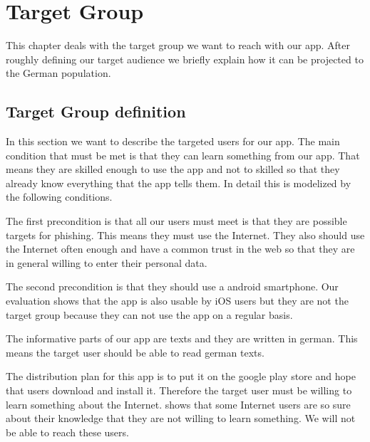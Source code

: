 \section{Target Group}
\label{s:target_group}
This chapter deals with the target group we want to reach with our app.
After roughly defining our target audience we briefly explain how it can be projected to the German population.

\subsection{Target Group definition}
In this section we want to describe the targeted users for our app.
The main condition that must be met is that they can learn something from our app.
That means they are skilled enough to use the app and not to skilled so that they already know everything that the app tells them.
In detail this is modelized by the following conditions.
\begin{description}[leftmargin=0cm]
\item[Attackability] The first precondition is that all our users must meet is that they are possible targets for phishing.
This means they must use the Internet.
They also should use the Internet often enough and have a common trust in the web so that they are in general willing to enter their personal data.
\cite{divsi2012divsi}
\item[Android Users] The second precondition is that they should use a android smartphone.
Our evaluation shows that the app is also usable by iOS users but they are not the target group because they can not use the app on a regular basis.
\item[Language] The informative parts of our app are texts and they are written in german.
This means the target user should be able to read german texts.
\item[Motivation] The distribution plan for this app is to put it on the google play store and hope that users download and install it.
Therefore the target user must be willing to learn something about the Internet.
\cite{divsi2012divsi} shows that some Internet users are so sure about their knowledge that they are not willing to learn something.
We will not be able to reach these users.
\end{description}


